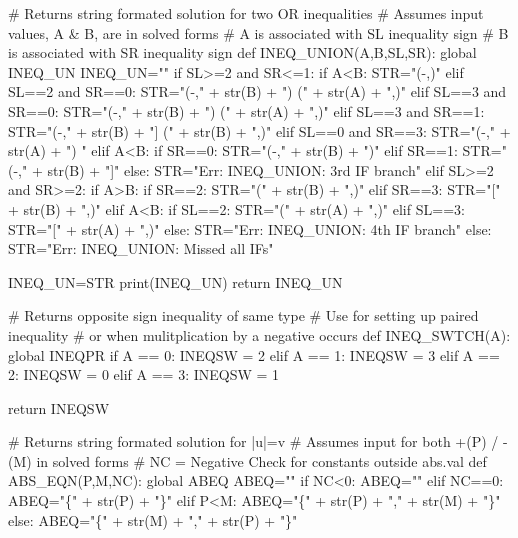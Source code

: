 \documentclass{article}%
\begin{document}
\begin{sagesilent}
# Returns string formated solution for two OR inequalities  
# Assumes input values, A & B, are in solved forms
# A is associated with SL inequality sign 
# B is associated with SR inequality sign  
def INEQ_UNION(A,B,SL,SR):
  global INEQ_UN
  INEQ_UN=""
  if SL>=2 and SR<=1:
    if A<B: STR="(-\infty,\infty)"
    elif SL==2 and SR==0:   STR="(-\infty," + str(B) + ") \cup (" + str(A) + ",\infty)"
    elif SL==3 and SR==0:   STR="(-\infty," + str(B) + ") \cup [" + str(A) + ",\infty)"
    elif SL==2 and SR==1:   STR="(-\infty," + str(B) + "] \cup (" + str(A) + ",\infty)"
    elif SL==3 and SR==1:   STR="(-\infty," + str(B) + "] \cup [" + str(A) + ",\infty)"
    else: STR="Err: INEQ_UNION: 1st IF branch"   
  elif SL<=1 and SR>=2:
    if A>B: STR="(-\infty,\infty)"
    elif SL==0 and SR==2:   STR="(-\infty," + str(A) + ") \cup (" + str(B) + ",\infty)" 
    elif SL==1 and SR==2:   STR="(-\infty," + str(A) + "] \cup (" + str(B) + ",\infty)"
    elif SL==0 and SR==3:   STR="(-\infty," + str(A) + ") \cup [" + str(B) + ",\infty)"
    elif SL==1 and SR==3:   STR="(-\infty," + str(A) + "] \cup [" + str(B) + ",\infty)"    
    else: STR="Err: INEQ_UNION: 2nd IF branch"   
  elif SL<=1 and SR<=1:
    if A>B:
      if SL==0:   STR="(-\infty," + str(A) + ")"
      elif SL==1:   STR="(-\infty," + str(A) + "]"
    elif A<B:
      if SR==0:   STR="(-\infty," + str(B) + ")"
      elif SR==1:   STR="(-\infty," + str(B) + "]"      
    else: STR="Err: INEQ_UNION: 3rd IF branch"  
  elif SL>=2 and SR>=2:
    if A>B:
      if SR==2:     STR="(" + str(B) + ",\infty)"
      elif SR==3:   STR="[" + str(B) + ",\infty)"
    elif A<B:
      if SL==2:     STR="(" + str(A) + ",\infty)"
      elif SL==3:   STR="[" + str(A) + ",\infty)"
    else: STR="Err: INEQ_UNION: 4th IF branch"
  else:
    STR="Err: INEQ_UNION: Missed all IFs"
    
  INEQ_UN=STR
  print(INEQ_UN)
  return INEQ_UN 

 

 
# Returns opposite sign inequality of same type
# Use for setting up paired inequality
# or when mulitplication by a negative occurs
def INEQ_SWTCH(A):
  global INEQPR
  if   A == 0:    INEQSW = 2
  elif A == 1:    INEQSW = 3
  elif A == 2:    INEQSW = 0
  elif A == 3:    INEQSW = 1
  
  return INEQSW
  
  
  
# Returns string formated solution for |u|=v  
# Assumes input for both +(P) / -(M) in solved forms
# NC = Negative Check for constants outside abs.val
def ABS_EQN(P,M,NC):
  global ABEQ
  ABEQ=""
  if NC<0:
    ABEQ="\emptyset"
  elif NC==0:
    ABEQ="\{" + str(P) + "\}"
  elif P<M:
    ABEQ="\{" + str(P) + "," + str(M) + "\}"
  else:
    ABEQ="\{" + str(M) + "," + str(P) + "\}"
  

\end{sagesilent}
\end{document}
